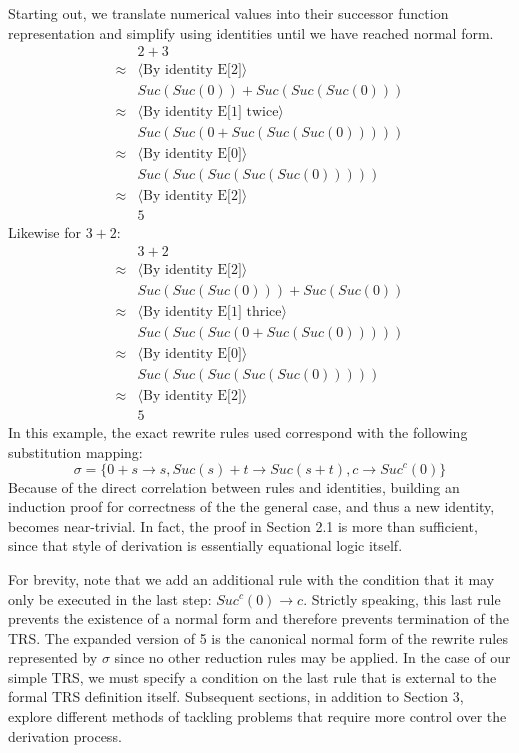 \documentclass{article}
\begin{document}
Starting out, we translate numerical values into their successor function representation and simplify using identities until we have reached normal form.
\begin{align*}
    &2 + 3\\
    \approx& \langle \text{By identity E[2]} \rangle\\
    &Suc(Suc(0)) + Suc(Suc(Suc(0)))\\
    \approx& \langle \text{By identity E[1] twice} \rangle\\
    &Suc(Suc(0 + Suc(Suc(Suc(0)))))\\
    \approx& \langle \text{By identity E[0]} \rangle\\
    &Suc(Suc(Suc(Suc(Suc(0)))))\\
    \approx& \langle \text{By identity E[2]} \rangle\\
    &5
\end{align*}
Likewise for $3+2$:
\begin{align*}
    &3 + 2\\
    \approx& \langle \text{By identity E[2]} \rangle\\
    &Suc(Suc(Suc(0))) + Suc(Suc(0))\\
    \approx& \langle \text{By identity E[1] thrice} \rangle\\
    &Suc(Suc(Suc(0 + Suc(Suc(0)))))\\
    \approx& \langle \text{By identity E[0]} \rangle\\
    &Suc(Suc(Suc(Suc(Suc(0)))))\\
    \approx& \langle \text{By identity E[2]} \rangle\\
    &5
\end{align*}
In this example, the exact rewrite rules used correspond with the following substitution mapping:
\[\sigma = \{0 + s \rightarrow s, Suc(s) + t \rightarrow Suc(s + t), c \rightarrow Suc^c(0)\}\]
Because of the direct correlation between rules and identities, building an induction proof for correctness of the the general case,
and thus a new identity, becomes near-trivial. In fact, the proof in Section 2.1 is more than sufficient, since that style of derivation
is essentially equational logic itself.

For brevity, note that we add an additional rule with the condition that it may only be executed in the last step: $Suc^c(0) \rightarrow c$.
Strictly speaking, this last rule prevents the existence of a normal form and therefore prevents termination of the TRS.
The expanded version of 5 is the canonical normal form of the rewrite rules represented by $\sigma$ since no other reduction rules may be applied.
In the case of our simple TRS, we must specify a condition on the last rule that is external to the formal TRS definition itself.
Subsequent sections, in addition to Section 3, explore different methods of tackling problems that require more control over the derivation process.
\end{document}
